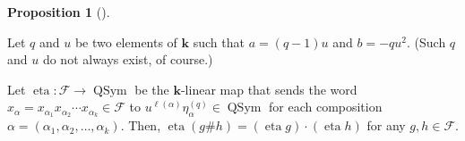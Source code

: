\documentclass[numbers=enddot,12pt,final,onecolumn,notitlepage]{scrartcl}%
\theoremstyle{definition}
\newtheorem{prop}[theo]{Proposition}
\newenvironment{proposition}[1][]
{\begin{prop}[#1]\begin{leftbar}}
{\end{leftbar}\end{prop}}
\begin{document}
\begin{proposition}
\label{prop.stufufuf.eta}Let $q$ and $u$ be two elements of $\mathbf{k}$ such
that $a=\left(  q-1\right)  u$ and $b=-qu^{2}$. (Such $q$ and $u$ do not
always exist, of course.)

Let $\operatorname*{eta}:\mathcal{F}\rightarrow\operatorname*{QSym}$ be the
$\mathbf{k}$-linear map that sends the word $x_{\alpha}=x_{\alpha_{1}%
}x_{\alpha_{2}}\cdots x_{\alpha_{k}}\in\mathcal{F}$ to $u^{\ell\left(
\alpha\right)  }\eta_{\alpha}^{\left(  q\right)  }\in\operatorname*{QSym}$ for
each composition $\alpha=\left(  \alpha_{1},\alpha_{2},\ldots,\alpha
_{k}\right)  $. Then, $\operatorname*{eta}\left(  g\#h\right)  =\left(
\operatorname*{eta}g\right)  \cdot\left(  \operatorname*{eta}h\right)  $ for
any $g,h\in\mathcal{F}$.
\end{proposition}
\end{document}
